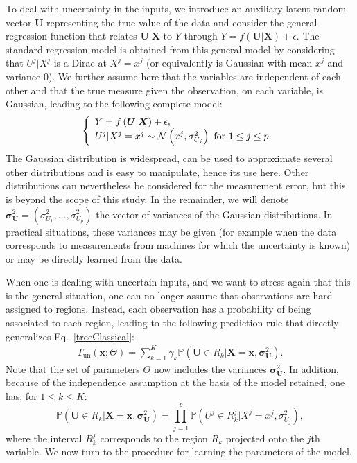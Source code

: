 \documentclass[twoside,11pt]{article}
\begin{document}
To deal with uncertainty in the inputs, we introduce an auxiliary latent random vector $\boldsymbol{U}$ representing the true value of the data and consider the general regression function that relates $\boldsymbol{U}|\boldsymbol{X}$ to $Y$ through $Y=f\left(\boldsymbol{U}|\boldsymbol{X}\right)+\epsilon$. The standard regression model is obtained from this general model by considering that $U^j | X^j$ is a Dirac at $X^j=x^j$ (or equivalently is Gaussian with mean $x^j$ and variance $0$). We further assume here that the variables are independent of each other and that the true measure given the observation, on each variable, is Gaussian, leading to the following complete model:
%
\begin{equation}
\left\{
\begin{array}{l}
Y=f\left(\boldsymbol{U}|\boldsymbol{X}\right)+\epsilon, \\
U^j | X^j=x^j \sim {\cal N} \left(x^j, \sigma_{U_j}^2\right) \text{ for } 1\leq j \leq p.
\end{array}
\right.
\label{model}
\end{equation}
%
The Gaussian distribution is widespread, can be used to approximate several other distributions and is easy to manipulate, hence its use here. Other distributions can nevertheless be considered for the measurement error, but this is beyond the scope of this study. In the remainder, we will denote $\boldsymbol{\sigma}_{\boldsymbol{U}}^2 = ({\sigma}_{U_1}^2, \ldots, {\sigma}_{U_p}^2)$ the vector of variances of the Gaussian distributions. In practical situations, these variances may be given (for example when the data corresponds to measurements from machines for which the uncertainty is known) or may be directly learned from the data. 

When one is dealing with uncertain inputs, and we want to stress again that this is the general situation, one can no longer assume that observations are hard assigned to regions. Instead, each observation has a probability of being associated to each region, leading to the following prediction rule that directly generalizes Eq.~\eqref{treeClassical}:
%
\begin{align}
    T_{\text{un}}\left(\boldsymbol{x}; \Theta\right) = \sum_{k=1}^K \gamma_k \mathbb{P}( \boldsymbol{U}\in R_k | \boldsymbol{X} =  \boldsymbol{x}, \boldsymbol{\sigma}_{\boldsymbol{U}}^2).
    \label{treeUncertainty}
\end{align}
%
Note that the set of parameters $\Theta$ now includes the variances $\boldsymbol{\sigma}_{\boldsymbol{U}}^2$. In addition, because of the independence assumption at the basis of the model retained, one has, for $1\leq k\leq K$:
%
\begin{equation}
\mathbb{P}(\boldsymbol{U}\in R_k | \boldsymbol{X} =  \boldsymbol{x}, \boldsymbol{\sigma}_{\boldsymbol{U}}^2) = \prod_{j=1}^{p} \mathbb{P}(U^j \in R_{k}^j| X^j = x^j,\sigma_{U_j}^2), \nonumber
\end{equation}
%
where the interval $R_k^j$ corresponds to the region  $R_k$ projected onto the $j$th variable. We now turn to the procedure for learning the parameters of the model.
\end{document}
